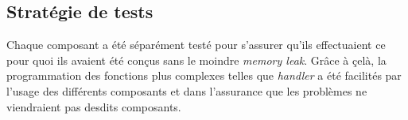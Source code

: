 \documentclass[../main.tex]{subfiles}
\begin{document}
\subsection{Stratégie de tests}
\label{sec:tests}

Chaque composant a été séparément testé pour s'assurer qu'ils effectuaient ce pour quoi ils avaient été conçus sans le moindre \textit{memory leak}.
Grâce à çelà, la programmation des fonctions plus complexes telles que \textit{handler} a été facilités par l'usage des différents composants et dans
l'assurance que les problèmes ne viendraient pas desdits composants.
\end{document}
